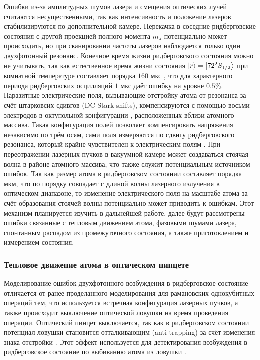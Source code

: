 Ошибки из-за амплитудных шумов лазера и смещения оптических лучей считаются несущественными, так как интенсивность и положение лазеров стабилизируются по дополнительной камере. Перекачка в соседние ридберговские состояния с другой проекцией полного момента $m_J$ \cite{Evered:2023aa} потенциально может происходить, но при сканировании частоты лазеров наблюдается только один двухфотонный резонанс. Конечное время жизни ридберговского состояния можно не учитывать, так как естественное время жизни состояния $\left| r \right\rangle = \left| 72^{2}S_{1/2} \right\rangle$ при комнатной температуре составляет порядка $160\text{ мкс}$ \cite{Ryabtsev_BBR}, что для характерного периода ридберговских осцилляций $1\text{ мкс}$ даёт ошибку на уровне $0.5 \%$. Паразитные электрические поля, вызывающие отстройку атома от резонанса за счёт штарковсих сдивгов (DC Stark shifts), компенсируются с помощью восьми электродов в октупольной конфигурации \cite{Beguin}, расположенных вблизи атомного массива. Такая конфигурация полей позволяет компенсировать напряжения независимо по трём осям, сами поля измеряются по сдвигу ридберговского резонанса, который крайне чувствителен к электрическим полям \cite{Beguin}. При переотражении лазерных пучков в вакуумной камере может создаваться стоячая волна в районе атомного массива, что также служит потенциальным источником ошибок. Так как размер атома в ридберговском состоянии составляет порядка мкм, что по порядку совпадает с длиной волны лазерного излучения в оптическом диапазоне, то изменение электрического поля на масштабе атома за счёт образования стоячей волны потенциально может приводить к ошибкам. Этот механизм  планируется изучить в дальнейшей работе, далее будут рассмотрены  ошибки связанные с тепловым движением атома, фазовыми шумами лазера, спонтанным распадом из промежуточного состояния, а также приготовлением и измерением состояния. 


\subsubsection{Тепловое движение атома в оптическом пинцете}

Моделирование ошибок двухфотонного возбуждения в ридберговское состояние отличается от ранее проделанного моделирования для рамановских однокубитных операций тем, что используется встречная конфигурация лазерных пучков, а также происходит выключение оптической ловушки на время проведения операции. Оптический пинцет выключается, так как в ридберговском состоянии потенциал ловушки становится отталкивающим (anti-trapping) за счёт изменения знака отстройки \cite{Browayes,Beguin,grimm1999optical}. Этот эффект используется для детектирования возбуждения в ридберговское состояние по выбиванию атома из ловушки \cite{Beguin}.

